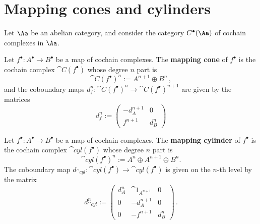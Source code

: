 
\section{Mapping cones and cylinders}

Let $\Aa$ be an abelian category, 
and consider the category $C^{\bullet}(\Aa)$
of cochain complexes in $\Aa$.

\begin{df}
    Let $f^{\bullet} : A^{\bullet} \to B^{\bullet}$
    be a map of cochain complexes.
    The \textbf{mapping cone} of $f^{\bullet}$
    is the cochain complex $\cat{C}(f^{\bullet})$
    whose degree $n$ part is
    \begin{equation*}
        \cat{C}(f^{\bullet})^{n} := A^{n+1} \oplus B^{n}\,,
    \end{equation*}
    and the coboundary maps 
    $d_{f}^{n} : \cat{C}(f^{\bullet})^{n} \longrightarrow \cat{C}(f^{\bullet})^{n+1}$
    are given by the matrices
    \begin{equation}\label{cone-coboundary}
        d^{n}_{f} := \begin{pmatrix} -d^{n+1}_{A} & 0 \\ f^{n+1} & d^{n}_{B} \end{pmatrix}
    \end{equation}
\end{df}

\begin{df}
    Let $f^{\bullet} : A^{\bullet} \to B^{\bullet}$
    be a map of cochain complexes.
    The \textbf{mapping cylinder} of $f^{\bullet}$
    is the cochain complex $\cat{cyl}(f^{\bullet})$
    whose degree $n$ part is
    \begin{equation*}
        \cat{cyl}(f^{\bullet})^{n}
        := A^{n} \oplus A^{n+1} \oplus B^{n}.
    \end{equation*}
    The coboundary map $d_{\cat{cyl}} : \cat{cyl}(f^{\bullet}) 
    \to \cat{cyl}(f^{\bullet})$ is given 
    on the $n$-th level by the matrix
    \begin{equation*}
        d_{\cat{cyl}}^n :=
        \begin{pmatrix}
            d_{A}^{n} & \cat{1}_{A^{n+1}} & 0 \\
            0 & -d_{A}^{n+1} & 0 \\
            0 & -f^{n+1} & d^{n}_{B}
        \end{pmatrix}\,.
    \end{equation*}
\end{df}

